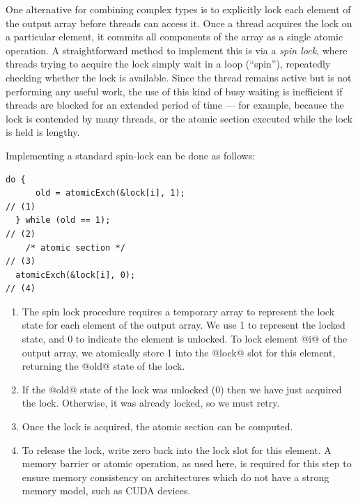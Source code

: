 One alternative for combining complex types is to explicitly lock each element
of the output array before threads can access it. Once a thread acquires the
lock on a particular element, it commits all components of the array as a single
atomic operation. A straightforward method to implement this is via a \emph{spin
lock}, where threads trying to acquire the lock simply wait in a loop
(``spin''), repeatedly checking whether the lock is available. Since the thread
remains active but is not performing any useful work, the use of this kind of
busy waiting is inefficient if threads are blocked for an extended period of
time --- for example, because the lock is contended by many threads, or the
atomic section executed while the lock is held is lengthy.

Implementing a standard spin-lock can be done as follows:
%
\begin{lstlisting}[style=cuda]
  do {
      old = atomicExch(&lock[i], 1);                                               // (1)
  } while (old == 1);                                                              // (2)
    /* atomic section */                                                           // (3)
  atomicExch(&lock[i], 0);                                                         // (4)
\end{lstlisting}
%
\begin{enumerate}
    \item The spin lock procedure requires a temporary array to represent the
        lock state for each element of the output array. We use 1 to represent
        the locked state, and 0 to indicate the element is unlocked. To lock
        element @i@ of the output array, we atomically store 1 into the @lock@
        slot for this element, returning the @old@ state of the lock.

    \item If the @old@ state of the lock was unlocked (0) then we have just
        acquired the lock. Otherwise, it was already locked, so we must retry.

    \item Once the lock is acquired, the atomic section can be computed.

    \item To release the lock, write zero back into the lock slot for this
        element. A memory barrier or atomic operation, as used here, is required
        for this step to ensure memory consistency on architectures which do not
        have a strong memory model, such as CUDA\cuda{} devices.

\end{enumerate}

